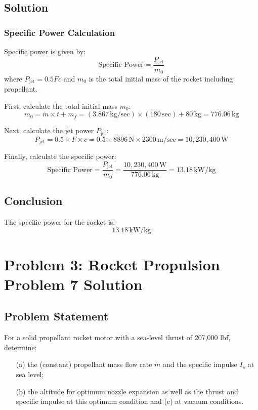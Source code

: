 \documentclass{article}
\begin{document}
\subsection{Solution}

\subsubsection{Specific Power Calculation}
Specific power is given by:
\[
\text{Specific Power} = \frac{P_{\text{jet}}}{m_0}
\]
where \( P_{\text{jet}} = 0.5Fc \) and \( m_0 \) is the total initial mass of the rocket including propellant.

First, calculate the total initial mass \( m_0 \):
\[
m_0 = \dot{m} \times t + m_f = (3.867 \, \text{kg/sec}) \times (180 \, \text{sec}) + 80 \, \text{kg} = 776.06 \, \text{kg}
\]

Next, calculate the jet power \( P_{\text{jet}} \):
\[
P_{\text{jet}} = 0.5 \times F \times c = 0.5 \times 8896 \, \text{N} \times 2300 \, \text{m/sec} = 10,230,400 \, \text{W}
\]

Finally, calculate the specific power:
\[
\text{Specific Power} = \frac{P_{\text{jet}}}{m_0} = \frac{10,230,400 \, \text{W}}{776.06 \, \text{kg}} = 13.18 \, \text{kW/kg}
\]

\subsection{Conclusion}
The specific power for the rocket is:
\[
\boxed{13.18 \, \text{kW/kg}}
\]

\section{Problem 3: Rocket Propulsion Problem 7 Solution}

\subsection{Problem Statement}
For a solid propellant rocket motor with a sea-level thrust of 207,000 lbf, determine:
\begin{itemize}
    \item[(a)] the (constant) propellant mass flow rate $\dot{m}$ and the specific impulse $I_s$ at sea level;
    \item[(b)] the altitude for optimum nozzle expansion as well as the thrust and specific impulse at this optimum condition and (c) at vacuum conditions.
\end{itemize}
\end{document}
